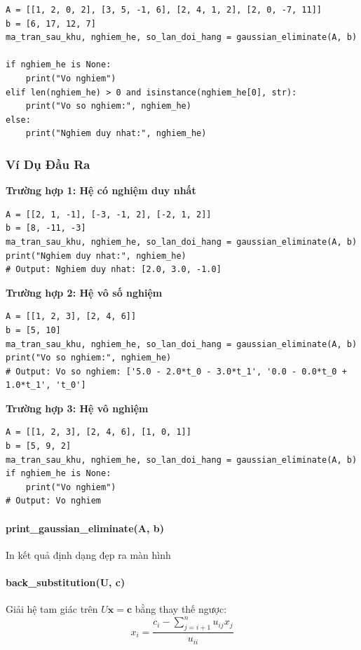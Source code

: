 \documentclass[12pt, a4paper, twoside]{article}
\begin{document}
\begin{lstlisting}
A = [[1, 2, 0, 2], [3, 5, -1, 6], [2, 4, 1, 2], [2, 0, -7, 11]]
b = [6, 17, 12, 7]
ma_tran_sau_khu, nghiem_he, so_lan_doi_hang = gaussian_eliminate(A, b)

if nghiem_he is None:
    print("Vo nghiem")
elif len(nghiem_he) > 0 and isinstance(nghiem_he[0], str):
    print("Vo so nghiem:", nghiem_he)
else:
    print("Nghiem duy nhat:", nghiem_he)
\end{lstlisting}

\subsubsection{Ví Dụ Đầu Ra}

\textbf{Trường hợp 1: Hệ có nghiệm duy nhất}
\begin{lstlisting}
A = [[2, 1, -1], [-3, -1, 2], [-2, 1, 2]]
b = [8, -11, -3]
ma_tran_sau_khu, nghiem_he, so_lan_doi_hang = gaussian_eliminate(A, b)
print("Nghiem duy nhat:", nghiem_he)
# Output: Nghiem duy nhat: [2.0, 3.0, -1.0]
\end{lstlisting}

\textbf{Trường hợp 2: Hệ vô số nghiệm}
\begin{lstlisting}
A = [[1, 2, 3], [2, 4, 6]]
b = [5, 10]
ma_tran_sau_khu, nghiem_he, so_lan_doi_hang = gaussian_eliminate(A, b)
print("Vo so nghiem:", nghiem_he)
# Output: Vo so nghiem: ['5.0 - 2.0*t_0 - 3.0*t_1', '0.0 - 0.0*t_0 + 1.0*t_1', 't_0']
\end{lstlisting}

\textbf{Trường hợp 3: Hệ vô nghiệm}
\begin{lstlisting}
A = [[1, 2, 3], [2, 4, 6], [1, 0, 1]]
b = [5, 9, 2]
ma_tran_sau_khu, nghiem_he, so_lan_doi_hang = gaussian_eliminate(A, b)
if nghiem_he is None:
    print("Vo nghiem")
# Output: Vo nghiem
\end{lstlisting}

\paragraph{print\_gaussian\_eliminate(A, b)}
In kết quả định dạng đẹp ra màn hình

\paragraph{back\_substitution(U, c)}
Giải hệ tam giác trên $U\mathbf{x} = \mathbf{c}$ bằng thay thế ngược:
\[
x_i = \frac{c_i - \sum_{j=i+1}^{n} u_{ij} x_j}{u_{ii}}
\]
\end{document}
